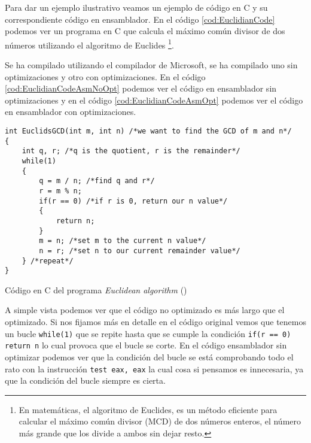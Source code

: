 Para dar un ejemplo ilustrativo veamos un ejemplo de código en C y su correspondiente
código en ensamblador. En el código \ref{cod:EuclidianCode} podemos ver un programa en C
que calcula el máximo común divisor de dos números utilizando el algoritmo de Euclides
\footnote{En matemáticas, el algoritmo de Euclides, es un método eficiente para calcular
el máximo común divisor (MCD) de dos números enteros, el número más grande que los divide
a ambos sin dejar resto.}.

Se ha compilado utilizando el compilador de Microsoft, se ha compilado uno sin optimizaciones
y otro con optimizaciones. En el código \ref{cod:EuclidianCodeAsmNoOpt} podemos ver el código
en ensamblador sin optimizaciones y en el código \ref{cod:EuclidianCodeAsmOpt} podemos ver
el código en ensamblador con optimizaciones.

\begin{mycode}
    \begin{verbatim}
int EuclidsGCD(int m, int n) /*we want to find the GCD of m and n*/
{
    int q, r; /*q is the quotient, r is the remainder*/
    while(1)
    {
        q = m / n; /*find q and r*/
        r = m % n;
        if(r == 0) /*if r is 0, return our n value*/
        {
            return n;
        }
        m = n; /*set m to the current n value*/
        n = r; /*set n to our current remainder value*/
    } /*repeat*/
}
    \end{verbatim}
    \caption[Código en C del programa \textit{Euclidean algorithm}]{Código en C del programa \textit{Euclidean algorithm} (\cite{EuclidianCode})}
    \label{cod:EuclidianCode}
\end{mycode}

A simple vista podemos ver que el código no optimizado es más largo que el optimizado. Si nos
fijamos más en detalle en el código original vemos que tenemos un bucle \texttt{while(1)}
que se repite hasta que se cumple la condición \texttt{if(r == 0) return n} lo cual
provoca que el bucle se corte. En el código ensamblador sin optimizar podemos ver que la condición
del bucle se está comprobando todo el rato con la instrucción \texttt{test eax, eax}
la cual cosa si pensamos es innecesaria, ya que la condición del bucle siempre es cierta.

